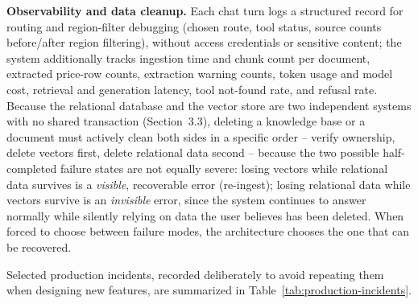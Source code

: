 \documentclass[11pt,a4paper]{article}
\begin{document}
\textbf{Observability and data cleanup.} Each chat turn logs a structured
record for routing and region-filter debugging (chosen route, tool status,
source counts before/after region filtering), without access credentials or
sensitive content; the system additionally tracks ingestion time and chunk
count per document, extracted price-row counts, extraction warning counts,
token usage and model cost, retrieval and generation latency, tool
not-found rate, and refusal rate. Because the relational database and the
vector store are two independent systems with no shared transaction
(Section~3.3), deleting a knowledge base or a document must actively clean
both sides in a specific order -- verify ownership, delete vectors first,
delete relational data second -- because the two possible half-completed
failure states are not equally severe: losing vectors while relational data
survives is a \emph{visible}, recoverable error (re-ingest); losing
relational data while vectors survive is an \emph{invisible} error, since
the system continues to answer normally while silently relying on data the
user believes has been deleted. When forced to choose between failure
modes, the architecture chooses the one that can be recovered.

Selected production incidents, recorded deliberately to avoid repeating them
when designing new features, are summarized in
Table~\ref{tab:production-incidents}.
\end{document}
